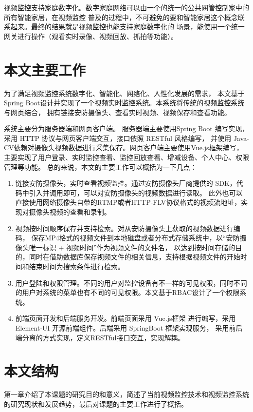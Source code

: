 视频监控支持家庭数字化。数字家庭网络可以由一个的统一的公共网管控制家中的所有智能家居，在视频监控
普及的过程中，不可避免的要和智能家居这个概念联系起来。最终的结果就是视频监控也能支持家庭数字化的
场景，能使用一个统一网关进行操作（观看实时录像、视频回放、抓拍等功能）。

\section{本文主要工作}
为了满足视频监控系统数字化、智能化、网络化、人性化发展的需求，
本文基于Spring Boot设计并实现了一个视频实时监控系统。本系统将传统的视频监控系统与网页结合，
拥有链接安防摄像头、查看实时视频、视频保存和查看功能。

系统主要分为服务器端和网页客户端。
服务器端主要使用Spring Boot 编写实现，采用 HTTP 协议与网页客户端交互，接口依照 RESTful 风格编写，
并使用 Java-CV依赖对摄像头视频数据进行采集保存。网页客户端主要使用Vue.js框架编写，主要实现了用户登录、实时监控查看、监控回放查看、增减设备、个人中心、权限管理等功能。
总的来说，本文的主要工作可以概括为一下几点：
\begin{enumerate}
    \item 链接安防摄像头，实时查看视频监控。通过安防摄像头厂商提供的 SDK，代码中引入并调用即可，可以对安防摄像头的视频数据进行读取。
    此外也可以直接使用网络摄像头自带的RTMP或者HTTP-FLV协议格式的视频流地址，实现对摄像头视频的查看和录制。
    \item 视频按时间顺序保存并支持检索。对从安防摄像头上获取的视频数据进行编码，
    保存MP4格式的视频文件到本地磁盘或者分布式存储系统中，以“安防摄像头唯一标识 + 视频时间”作为视频文件的文件名，
    以达到按时间存储的目的，同时在借助数据库保存视频文件的相关信息，支持根据视频文件的开始时间和结束时间为搜索条件进行检索。
    \item 用户登陆和权限管理。不同的用户对监控设备有不一样的可见权限，同时不同的用户对系统的菜单也有不同的可见权限。本文基于RBAC设计了一个权限系统。
    \item 前端页面开发和后端服务开发。前端页面采用 Vue.js框架 进行编写，采用 Element-UI 开源前端组件。后端采用  SpringBoot 框架实现服务，
    采用前后端分离的方式实现，定义RESTful接口交互，实现解耦。
\end{enumerate}


\section{本文结构}
第一章介绍了本课题的研究目的和意义，简述了当前视频监控技术和视频监控系统的研究现状和发展趋势，最后对课题的主要工作进行了概括。

